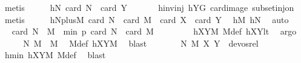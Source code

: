 \begin{isabellebody}
\ metis\isanewline
\ \ \isamarkupfalse%
\ \isamarkupfalse%
\ hN{\isacharcolon}{\kern0pt}\ {\isachardoublequoteopen}card\ {\isacharquery}{\kern0pt}N\ {\isacharequal}{\kern0pt}\ card\ Y{\isachardoublequoteclose}\ \isanewline
\ \ \ \ \isamarkupfalse%
\ hinvinj\ hYG\ card{\isacharunderscore}{\kern0pt}image\ subset{\isacharunderscore}{\kern0pt}inj{\isacharunderscore}{\kern0pt}on\ \isamarkupfalse%
\ metis\isanewline
\ \ \isamarkupfalse%
\ \isamarkupfalse%
\ hNplusM{\isacharcolon}{\kern0pt}\ {\isachardoublequoteopen}card\ {\isacharquery}{\kern0pt}N\ {\isacharplus}{\kern0pt}\ card\ {\isacharquery}{\kern0pt}M\ {\isacharequal}{\kern0pt}\ card\ X\ {\isacharplus}{\kern0pt}\ card\ Y{\isachardoublequoteclose}\ \isamarkupfalse%
\ hM\ hN\ \isamarkupfalse%
\ auto\isanewline
\ \ \isamarkupfalse%
\ \isamarkupfalse%
\ {\isachardoublequoteopen}card\ {\isacharparenleft}{\kern0pt}{\isacharquery}{\kern0pt}N\ {\isasymcdots}\ {\isacharquery}{\kern0pt}M{\isacharparenright}{\kern0pt}\ {\isacharless}{\kern0pt}\ min\ p\ {\isacharparenleft}{\kern0pt}card\ {\isacharquery}{\kern0pt}N\ {\isacharplus}{\kern0pt}\ card\ {\isacharquery}{\kern0pt}M\ {\isacharminus}{\kern0pt}\ {}{\isacharparenright}{\kern0pt}{\isachardoublequoteclose}\ \isanewline
\ \ \ \ \isamarkupfalse%
\ hXYM\ M{\isacharunderscore}{\kern0pt}def\ hXYlt\ \isamarkupfalse%
\ argo\isanewline
\ \ \isamarkupfalse%
\ \isamarkupfalse%
\ {\isachardoublequoteopen}{\isacharparenleft}{\kern0pt}{\isacharquery}{\kern0pt}N{\isacharcomma}{\kern0pt}\ {\isacharquery}{\kern0pt}M{\isacharparenright}{\kern0pt}\ {\isasymin}\ M{\isachardoublequoteclose}\ \isamarkupfalse%
\ M{\isacharunderscore}{\kern0pt}def\ hXYM\ \isamarkupfalse%
\ blast\isanewline
\ \ \ \ \isamarkupfalse%
\ \isamarkupfalse%
\ {\isachardoublequoteopen}{\isacharparenleft}{\kern0pt}{\isacharparenleft}{\kern0pt}{\isacharquery}{\kern0pt}N{\isacharcomma}{\kern0pt}\ {\isacharquery}{\kern0pt}M{\isacharparenright}{\kern0pt}{\isacharcomma}{\kern0pt}\ {\isacharparenleft}{\kern0pt}X{\isacharcomma}{\kern0pt}\ Y{\isacharparenright}{\kern0pt}{\isacharparenright}{\kern0pt}\ {\isasymnotin}\ devos{\isacharunderscore}{\kern0pt}rel{\isachardoublequoteclose}\ \isamarkupfalse%
\ hmin\ hXYM\ M{\isacharunderscore}{\kern0pt}def\ \isamarkupfalse%
\ blast\isanewline

\end{isabellebody}
